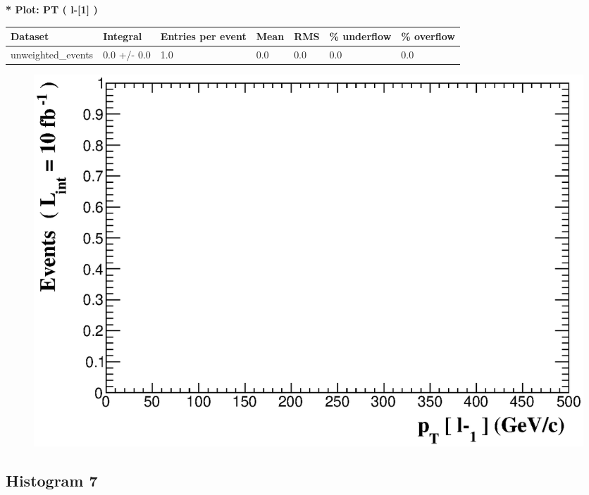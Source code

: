 \documentclass[a4paper, 10pt]{article}
\begin{document}
\textbf{* Plot: PT ( l-[1] ) }\\
   \begin{table}[H]
  \begin{center}
    \begin{tabular}{|m{23.0mm}|m{23.0mm}|m{18.0mm}|m{19.0mm}|m{19.0mm}|m{19.0mm}|m{19.0mm}|}
      \hline
      {\cellcolor{yellow}         Dataset}& {\cellcolor{yellow}         Integral}& {\cellcolor{yellow}         Entries per event}& {\cellcolor{yellow}         Mean}& {\cellcolor{yellow}         RMS}& {\cellcolor{yellow}         \% underflow}& {\cellcolor{yellow}         \% overflow}\\
      \hline
      {\cellcolor{white}         unweighted\_events}& {\cellcolor{white}         0.0 +/\-- 0.0}& {\cellcolor{white}         1.0}& {\cellcolor{white}         0.0}& {\cellcolor{white}         0.0}& {\cellcolor{green}         0.0}& {\cellcolor{green}         0.0}\\
\hline
    \end{tabular}
  \end{center}
\end{table}

\begin{figure}[H]
  \begin{center}
    \includegraphics[scale=0.45]{selection_5.eps}\\
\caption{   }
  \end{center}
\end{figure}
      \newpage
\subsection{ Histogram 7}
\end{document}
